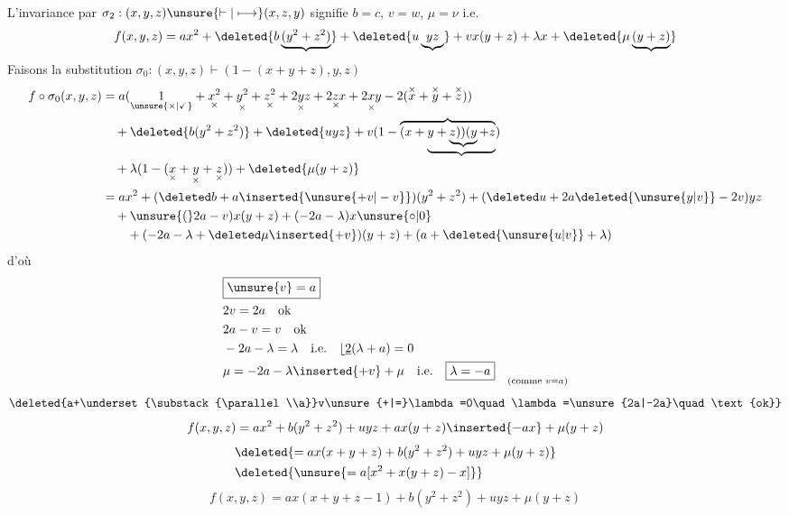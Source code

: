 L'invariance par $\sigma_2:(x,y,z)\unsure{\vdash|\longmapsto}(x,z,y)$ signifie $b=c$, $v=w$, $\mu=\nu$ i.e.
\[
f(x,y,z)=ax^2+\deleted{b\underbrace{(y^2+z^2)}}+\deleted{u\underbrace{yz}}+vx(y+z)+\lambda x+\deleted{\mu\underbrace{(y+z)}}
\]
Faisons la substitution $\sigma_0:(x,y,z)\vdash(1-(x+y+z),y,z)$
\[
\begin{aligned}
f\circ\sigma_0(x,y,z)
&=a(\underset{\unsure{\times|\checkmark}}1+\underset{\times}{x^2}+\underset{\times}{y^2}+\underset{\times}{z^2}+\underset{\times}{2yz}+\underset{\times}{2zx}+\underset{\times}{2xy}-2(\overset{\times}x+\overset{\times}y+\overset{\times}z))\\
&\quad+\deleted{b(y^2+z^2)}+\deleted{uyz}+v(1-\overbrace{(x+\underbrace{y+\underbrace{z))(y}+z}})\\
&\quad+\lambda(1-(\underset{\times}x+\underset{\times}y+\underset{\times}z))+\deleted{\mu(y+z)}\\
&=ax^2+(\deleted b+a\inserted{\unsure{+v|-v}})(y^2+z^2)+(\deleted u+2a\deleted{\unsure{y|v}}-2v)yz\\
&\quad+\unsure{(}2a-v)x(y+z)+(-2a-\lambda)x\unsure{\circ|0}\\
&\qquad+(-2a-\lambda+\deleted\mu\inserted{+v})(y+z)+(a+\deleted{\unsure{u|v}}+\lambda)
\end{aligned}
\]
d'où
\[
\begin{aligned}
&\boxed{\unsure{v}=a}\\
&2v=2a\quad\text{ok}\\
&2a-v=v\quad\text{ok}\\
&-2a-\lambda=\lambda\quad\text{i.e.}\quad\lfloor\underline{2}(\lambda+a)=0\\
&\mu=-2a-\lambda\inserted{+v}+\mu\quad\text{i.e.}\quad\boxed{\lambda=-a}\quad\underset{\text{(comme }v=a\text{)}}{}
\end{aligned}
\]
\[
\deleted{a+\underset{\substack{\parallel\\a}}v\unsure{+|=}\lambda=0\quad\lambda=\unsure{2a|-2a}\quad\text{ok}}
\]
\[
f(x,y,z)=ax^2+b(y^2+z^2)+uyz+ax(y+z)\inserted{-ax}+\mu(y+z)
\]
\[
\begin{aligned}
&\deleted{=ax(x+y+z)+b(y^2+z^2)+uyz+\mu(y+z)}\\
&\deleted{\unsure{=a[x^2+x(y+z)-x]}}
\end{aligned}
\]
\[
f(x,y,z)=ax(x+y+z-1)+b(y^2+z^2)+uyz+\mu(y+z)
\]
